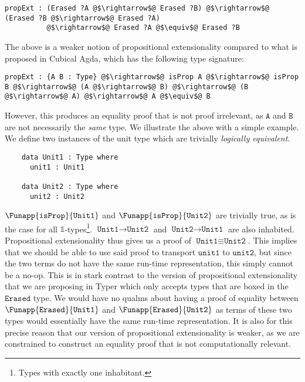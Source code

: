 \documentclass[12pt,twoside,maitrise]{dms}
\theoremstyle{definition}
\numberwithin{equation}{section}
\numberwithin{table}{chapter}
\numberwithin{figure}{chapter}
\newcommand\id[1] {\texttt{#1}}
\begin{document}
\begin{verbatim}
propExt : (Erased ?A @$\rightarrow$@ Erased ?B) @$\rightarrow$@ (Erased ?B @$\rightarrow$@ Erased ?A)
          @$\rightarrow$@ Erased ?A @$\equiv$@ Erased ?B
\end{verbatim}

The above is a weaker notion of propositional extensionality compared to what is
proposed in Cubical Agda, which has the following type signature:

\begin{verbatim}
propExt : {A B : Type} @$\rightarrow$@ isProp A @$\rightarrow$@ isProp B @$\rightarrow$@ (A @$\rightarrow$@ B) @$\rightarrow$@ (B @$\rightarrow$@ A) @$\rightarrow$@ A @$\equiv$@ B
\end{verbatim}

However, this produces an equality proof that is not proof irrelevant, as
$\id{A}$ and $\id{B}$ are not necessarily the \emph{same} type. We illustrate
the above with a simple example. We define two instances of the unit type which
are trivially \emph{logically equivalent}.

\begin{verbatim}
    data Unit1 : Type where
      unit1 : Unit1

    data Unit2 : Type where
      unit2 : Unit2
\end{verbatim}

$\Funapp{\id{isProp}}{\id{Unit1}}$ and $\Funapp{\id{isProp}}{\id{Unit2}}$ are
trivially true, as is the case for all $\mathbb{1}$-types\footnote{Types with
exactly one inhabitant.}. $\id{Unit1} \rightarrow \id{Unit2}$ and $\id{Unit2}
\rightarrow \id{Unit1}$ are also inhabited. Propositional extensionality thus
gives us a proof of $\id{Unit1} \equiv \id{Unit2}$. This implies that we should
be able to use said proof to transport $\id{unit1}$ to $\id{unit2}$, but since
the two terms do not have the same run-time representation, this simply cannot be
a no-op. This is in stark contrast to the version of propositional extensionality
that we are proposing in Typer which only accepts types that are boxed in the
$\id{Erased}$ type. We would have no qualms about having a proof of equality
between $\Funapp{\id{Erased}}{\id{Unit1}}$ and
$\Funapp{\id{Erased}}{\id{Unit2}}$ as terms of these two types would essentially
have the same run-time representation. It is also for this precise reason that
our version of propositional extensionality is weaker, as we are constrained to
construct an equality proof that is not computationally relevant.
\end{document}
